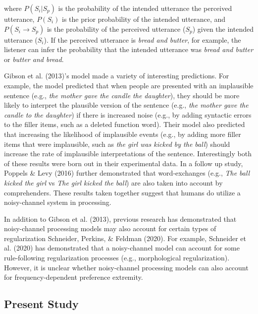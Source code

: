 \documentclass[10pt, letterpaper]{article}
\begin{document}
\noindent where \(P(S_i|S_p)\) is the probability of the intended
utterance the perceived utterance, \(P(S_i)\) is the prior probability
of the intended utterance, and \(P(S_i \to S_p)\) is the probability of
the perceived utterance (\(S_p\)) given the intended utterance
(\(S_i\)). If the perceived utterance is \emph{bread and butter}, for
example, the listener can infer the probability that the intended
utterance was \emph{bread and butter} or \emph{butter and bread}.

Gibson et al. (2013)'s model made a variety of interesting predictions.
For example, the model predicted that when people are presented with an
implausible sentence (e.g., \emph{the mother gave the candle the
daughter}), they should be more likely to interpret the plausible
version of the sentence (e.g., \emph{the mother gave the candle to the
daughter}) if there is increased noise (e.g., by adding syntactic errors
to the filler items, such as a deleted function word). Their model also
predicted that increasing the likelihood of implausible events (e.g., by
adding more filler items that were implausible, such as \emph{the girl
was kicked by the ball}) should increase the rate of implausible
interpretations of the sentence. Interestingly both of these results
were born out in their experimental data. In a follow up study, Poppels
\& Levy (2016) further demonstrated that word-exchanges (e.g., \emph{The
ball kicked the girl} vs \emph{The girl kicked the ball}) are also taken
into account by comprehenders. These results taken together suggest that
humans do utilize a noisy-channel system in processing.

In addition to Gibson et al. (2013), previous research has demonstrated
that noisy-channel processing models may also account for certain types
of regularization Schneider, Perkins, \& Feldman (2020). For example,
Schneider et al. (2020) has demonstrated that a noisy-channel model can
account for some rule-following regularization processes (e.g.,
morphological regularization). However, it is unclear whether
noisy-channel processing models can also account for frequency-dependent
preference extremity.

\hypertarget{present-study}{%
\subsection{Present Study}\label{present-study}}
\end{document}
